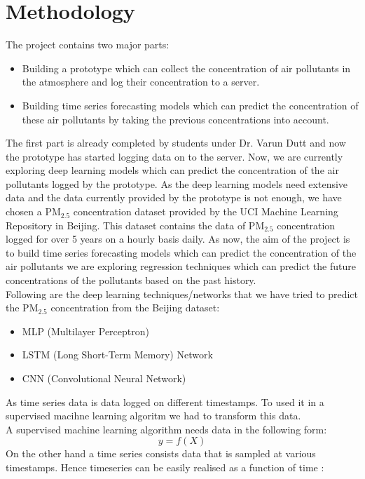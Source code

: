 \documentclass{report}
\begin{document}
\section{Methodology}       												%
The project contains two major parts:
\begin{itemize}
	\item Building a prototype which can collect the concentration of air pollutants in the atmosphere and log their concentration to a server.
	\item Building time series forecasting models which can predict the concentration of these air pollutants by taking the previous concentrations into account.
\end{itemize}
	The first part is already completed by students under Dr. Varun Dutt and now the prototype has started logging data on to the server. Now, we are currently exploring deep learning models which can predict the concentration of the air pollutants logged by the prototype. As the deep learning models need extensive data and the data currently provided by the prototype is not enough, we have chosen a PM$_{2.5}$ concentration dataset provided by the UCI Machine Learning Repository in Beijing. This dataset contains the data of PM$_{2.5}$ concentration logged for over 5 years on a hourly basis daily. 
As now, the aim of the project is to build time series forecasting models which can predict the concentration of the air pollutants we are exploring regression techniques  which can predict the future concentrations of the pollutants based on the past history.
\\ Following are the deep learning techniques/networks that we have tried to predict the PM$_{2.5}$ concentration from the Beijing dataset:
\begin{itemize}
	\item MLP (Multilayer Perceptron)
	\item LSTM (Long Short-Term Memory) Network
	\item CNN (Convolutional Neural Network)
\end{itemize}
As time series data is data logged on different timestamps. To used it in a supervised macihne learning algoritm we had to transform this data.\\
A supervised machine learning algorithm needs data in the following form:
\begin{equation}
y = f(X)\label{eq}
\end{equation}
On the other hand a time series consists data that is sampled at various timestamps. Hence timeseries can be easily realised as a function of time : 
\end{document}
